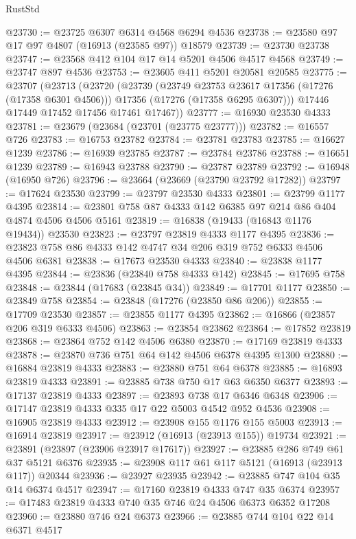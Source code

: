 \begin{lexlean}{RustStd}
\begin{coremodule}
@23730 := @23725 @6307 @6314 @4568 @6294 @4536
@23738 := @23580 @97 @17 @97 @4807 (@16913 (@23585 @97)) @18579
@23739 := @23730 @23738
@23747 := @23568 @412 @104 @17 @14 @5201 @4506 @4517 @4568
@23749 := @23747 @897 @4536
@23753 := @23605 @411 @5201 @20581 @20585
@23775 := @23707
    (@23713
      (@23720
        (@23739
          (@23749 @23753 @23617 @17356 (@17276 (@17358 @6301 @4506)))
          @17356
          (@17276 (@17358 @6295 @6307)))
        @17446
        @17449
        @17452
        @17456
        @17461
        @17467))
@23777 := @16930 @23530 @4333
@23781 := @23679 (@23684 (@23701 (@23775 @23777)))
@23782 := @16557 @726
@23783 := @16753 @23782
@23784 := @23781 @23783
@23785 := @16627 @1239
@23786 := @16939 @23785
@23787 := @23784 @23786
@23788 := @16651 @1239
@23789 := @16943 @23788
@23790 := @23787 @23789
@23792 := @16948 (@16950 @726)
@23796 := @23664 (@23669 (@23790 @23792 @17282))
@23797 := @17624 @23530
@23799 := @23797 @23530 @4333
@23801 := @23799 @1177 @4395
@23814 := @23801 @758 @87 @4333 @142 @6385 @97 @214 @86 @404 @4874 @4506 @4506 @5161
@23819 := @16838 (@19433 (@16843 @1176 @19434)) @23530
@23823 := @23797 @23819 @4333 @1177 @4395
@23836 := @23823 @758 @86 @4333 @142 @4747 @34 @206 @319 @752 @6333 @4506 @4506 @6381
@23838 := @17673 @23530 @4333
@23840 := @23838 @1177 @4395
@23844 := @23836 (@23840 @758 @4333 @142)
@23845 := @17695 @758
@23848 := @23844 (@17683 (@23845 @34))
@23849 := @17701 @1177
@23850 := @23849 @758
@23854 := @23848 (@17276 (@23850 @86 @206))
@23855 := @17709 @23530
@23857 := @23855 @1177 @4395
@23862 := @16866 (@23857 @206 @319 @6333 @4506)
@23863 := @23854 @23862
@23864 := @17852 @23819
@23868 := @23864 @752 @142 @4506 @6380
@23870 := @17169 @23819 @4333
@23878 := @23870 @736 @751 @64 @142 @4506 @6378 @4395 @1300
@23880 := @16884 @23819 @4333
@23883 := @23880 @751 @64 @6378
@23885 := @16893 @23819 @4333
@23891 := @23885 @738 @750 @17 @63 @6350 @6377
@23893 := @17137 @23819 @4333
@23897 := @23893 @738 @17 @6346 @6348
@23906 := @17147 @23819 @4333 @335 @17 @22 @5003 @4542 @952 @4536
@23908 := @16905 @23819 @4333
@23912 := @23908 @155 @1176 @155 @5003
@23913 := @16914 @23819
@23917 := @23912 (@16913 (@23913 @155)) @19734
@23921 := @23891 (@23897 (@23906 @23917 @17617))
@23927 := @23885 @286 @749 @61 @37 @5121 @6376
@23935 := @23908 @117 @61 @117 @5121 (@16913 (@23913 @117)) @20344
@23936 := @23927 @23935
@23942 := @23885 @747 @104 @35 @14 @6374 @4517
@23947 := @17160 @23819 @4333 @747 @35 @6374
@23957 := @17483 @23819 @4333 @740 @35 @746 @24 @4506 @6373 @6352 @17208
@23960 := @23880 @746 @24 @6373
@23966 := @23885 @744 @104 @22 @14 @6371 @4517

\end{coremodule}
\end{lexlean}
